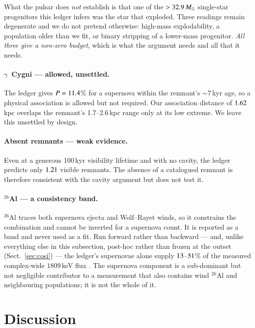 \documentclass{aa}
\begin{document}
What the pulsar does \emph{not} establish is that one of the
$>32.9\,M_\odot$ single-star progenitors this ledger infers was
the star that exploded. Three readings remain degenerate and we do not pretend
otherwise: high-mass explodability, a population older than we fit, or binary
stripping of a lower-mass progenitor. \emph{All three give a non-zero budget},
which is what the argument needs and all that it needs.

\paragraph{$\gamma$~Cygni --- allowed, unsettled.}
The ledger gives $P = 11.4$\% for a supernova within the remnant's
$\sim$7\,kyr age, so a physical association is allowed but not required. Our
association distance of $1.62$\,kpc overlaps the remnant's
1.7--2.6\,kpc range only at its low extreme. We leave this unsettled by design.

\paragraph{Absent remnants --- weak evidence.}
Even at a generous 100\,kyr visibility lifetime and with no cavity, the ledger
predicts only $1.21$ visible remnants. The absence of a catalogued
remnant is therefore consistent with the cavity argument but does not test it.

\paragraph{$^{26}$Al --- a consistency band.}
$^{26}$Al traces both supernova ejecta and Wolf--Rayet winds, so it constrains
the combination and cannot be inverted for a supernova count. It is reported as
a band and never used as a fit. Run forward rather than backward --- and, unlike
everything else in this subsection, post-hoc rather than frozen at the outset
(Sect.~\ref{sec:cosi}) --- the ledger's supernovae alone supply
$13$--$51$\% of the measured complex-wide $1809$\,keV flux
\citep{martin2009}. The supernova component is a sub-dominant but not negligible
contributor to a measurement that also contains wind $^{26}$Al and neighbouring
populations; it is not the whole of it.

\section{Discussion}\label{sec:discussion}
\end{document}
